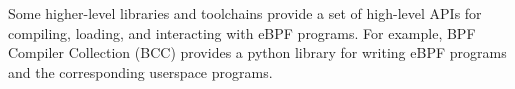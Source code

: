 Some higher-level libraries and toolchains provide a set of high-level APIs for compiling, loading, and interacting with eBPF programs.
For example, BPF Compiler Collection (BCC) provides a python library for writing eBPF programs and the corresponding userspace programs.













